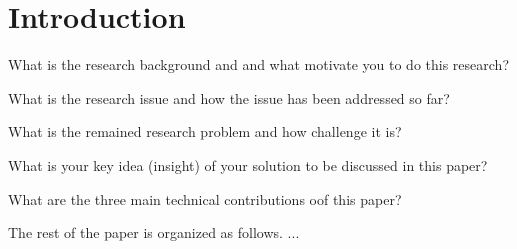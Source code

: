 \section{Introduction}

What is the research background and and what motivate you to do this research?

What is the research issue and how the issue has been addressed so far?

What is the remained research problem and how challenge it is?

What is your key idea (insight) of your solution to be discussed in this paper?

What are the three main technical contributions oof this paper?

The rest of the paper is organized as follows. ...